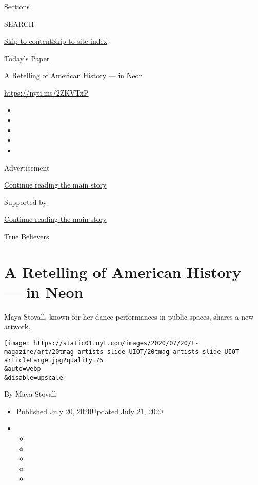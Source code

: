 Sections

SEARCH

\protect\hyperlink{site-content}{Skip to
content}\protect\hyperlink{site-index}{Skip to site index}

\href{https://myaccount.nytimes.com/auth/login?response_type=cookie\&client_id=vi}{}

\href{https://www.nytimes.com/section/todayspaper}{Today's Paper}

A Retelling of American History --- in Neon

\url{https://nyti.ms/2ZKVTxP}

\begin{itemize}
\item
\item
\item
\item
\item
\end{itemize}

Advertisement

\protect\hyperlink{after-top}{Continue reading the main story}

Supported by

\protect\hyperlink{after-sponsor}{Continue reading the main story}

True Believers

\hypertarget{a-retelling-of-american-history--in-neon}{%
\section{A Retelling of American History --- in
Neon}\label{a-retelling-of-american-history--in-neon}}

Maya Stovall, known for her dance performances in public spaces, shares
a new artwork.

\texttt{[image: https://static01.nyt.com/images/2020/07/20/t-magazine/art/20tmag-artists-slide-UIOT/20tmag-artists-slide-UIOT-articleLarge.jpg?quality=75\\\&auto=webp\\\&disable=upscale]}

By Maya Stovall

\begin{itemize}
\item
  Published July 20, 2020Updated July 21, 2020
\item
  \begin{itemize}
  \item
  \item
  \item
  \item
  \item
  \end{itemize}
\end{itemize}

